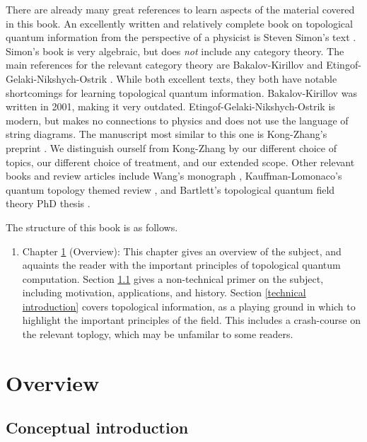 \documentclass{article}
\theoremstyle{definition}
\numberwithin{figure}{section}
\begin{document}
There are already many great references to learn aspects of the material covered in this book. An excellently written and relatively complete book on topological quantum information from the perspective of a physicist is Steven Simon's text \cite{simon2023topological}. Simon's book is very algebraic, but does \textit{not} include any category theory. The main references for the relevant category theory are Bakalov-Kirillov \cite{bakalov2001lectures} and Etingof-Gelaki-Nikshych-Ostrik \cite{etingof2016tensor}. While both excellent texts, they both have notable shortcomings for learning topological quantum information. Bakalov-Kirillov was written in 2001, making it very outdated. Etingof-Gelaki-Nikshych-Ostrik is modern, but makes no connections to physics and does not use the language of string diagrams. The manuscript most similar to this one is Kong-Zhang's preprint \cite{kong2022invitation}. We distinguish ourself from Kong-Zhang by our different choice of topics, our different choice of treatment, and our extended scope. Other relevant books and review articles include Wang's monograph \cite{wang2010topological}, Kauffman-Lomonaco's quantum topology themed review \cite{kauffman2009topological}, and Bartlett's topological quantum field theory PhD thesis \cite{bartlett2005categorical}.

The structure of this book is as follows.

\begin{enumerate}
\item Chapter \ref{overview} (Overview): This chapter gives an overview of the subject, and aquaints the reader with the important principles of topological quantum computation. Section \ref{conceptual introduction} gives a non-technical primer on the subject, including motivation, applications, and history. Section \ref{technical introduction} covers topological  information, as a playing ground in which to highlight the important principles of the field. This includes a crash-course on the relevant toplogy, which may be unfamilar to some readers.

\end{enumerate}

\newpage

\section{Overview}
\label{overview}

\subsection{Conceptual introduction}
\label{conceptual introduction}
\end{document}
